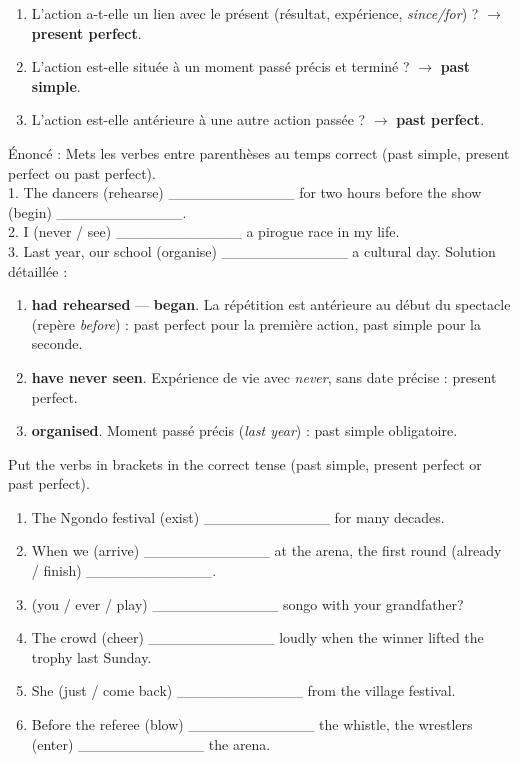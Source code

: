 \documentclass[11pt]{article}
\begin{document}
\begin{methode}
\begin{enumerate}
\item L'action a-t-elle un lien avec le présent (résultat, expérience, \emph{since/for}) ? $\rightarrow$ \textbf{present perfect}.
\item L'action est-elle située à un moment passé précis et terminé ? $\rightarrow$ \textbf{past simple}.
\item L'action est-elle antérieure à une autre action passée ? $\rightarrow$ \textbf{past perfect}.
\end{enumerate}
\end{methode}

\begin{exoresolu}
Énoncé : Mets les verbes entre parenthèses au temps correct (past simple, present perfect ou past perfect).\\
1. The dancers (rehearse) \_\_\_\_\_\_\_\_\_\_\_\_ for two hours before the show (begin) \_\_\_\_\_\_\_\_\_\_\_\_.\\
2. I (never / see) \_\_\_\_\_\_\_\_\_\_\_\_ a pirogue race in my life.\\
3. Last year, our school (organise) \_\_\_\_\_\_\_\_\_\_\_\_ a cultural day.
\tcblower
Solution détaillée :
\begin{enumerate}
\item \textbf{had rehearsed} --- \textbf{began}. La répétition est antérieure au début du spectacle (repère \emph{before}) : past perfect pour la première action, past simple pour la seconde.
\item \textbf{have never seen}. Expérience de vie avec \emph{never}, sans date précise : present perfect.
\item \textbf{organised}. Moment passé précis (\emph{last year}) : past simple obligatoire.
\end{enumerate}
\end{exoresolu}

\begin{exercice}
Put the verbs in brackets in the correct tense (past simple, present perfect or past perfect).
\begin{enumerate}
\item The Ngondo festival (exist) \_\_\_\_\_\_\_\_\_\_\_\_ for many decades.
\item When we (arrive) \_\_\_\_\_\_\_\_\_\_\_\_ at the arena, the first round (already / finish) \_\_\_\_\_\_\_\_\_\_\_\_.
\item (you / ever / play) \_\_\_\_\_\_\_\_\_\_\_\_ songo with your grandfather?
\item The crowd (cheer) \_\_\_\_\_\_\_\_\_\_\_\_ loudly when the winner lifted the trophy last Sunday.
\item She (just / come back) \_\_\_\_\_\_\_\_\_\_\_\_ from the village festival.
\item Before the referee (blow) \_\_\_\_\_\_\_\_\_\_\_\_ the whistle, the wrestlers (enter) \_\_\_\_\_\_\_\_\_\_\_\_ the arena.
\end{enumerate}
\end{exercice}
\end{document}
